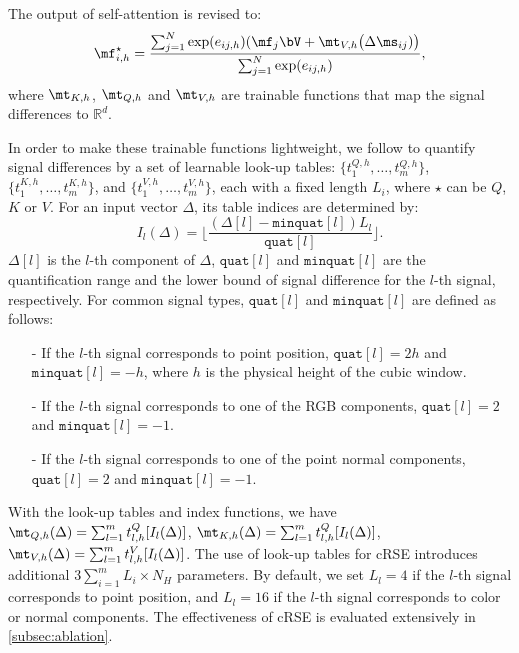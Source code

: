 \documentclass[10pt,twocolumn,letterpaper]{article}
\begin{document}
The output of self-attention is revised to:
\begin{equation}
\mf^\star_{i,h} = \dfrac{\sum_{j=1}^N \exp(e_{ij,h}) (\mf_j \bV +  \mt_{V,h}\bigl(\Delta \ms_{ij})\bigr)}{\sum_{j=1}^N \exp(e_{ij,h})},
\end{equation}
where $\mt_{K,h}$, $\mt_{Q,h}$ and $\mt_{V,h}$ are trainable functions that map the signal differences to $\mathbb{R}^d$.

In order to make these trainable functions lightweight, we follow \cite{shaw2018self, lai2022stratified} to quantify signal differences by a set of learnable look-up tables: $\{t^{Q,h}_1, \ldots, t^{Q,h}_m\}$, $\{t^{K,h}_1, \ldots, t^{K,h}_m\}$, and $\{t^{V,h}_1, \ldots, t^{V,h}_m\}$, each with a fixed length $L_i$, where $\star$ can be $Q$, $K$ or $V$. For an input vector $\Delta$, its table indices are determined by: \begin{equation} I_l(\Delta) = \bigl\lfloor \frac{( \Delta[l] - \texttt{minquat}[l] )L_l}{\texttt{quat}[l]} \bigr\rfloor. \end{equation} $\Delta[l]$ is the $l$-th component of $\Delta$, $\texttt{quat}[l]$ and $\texttt{minquat}[l]$ are the quantification range and the lower bound of signal difference for the $l$-th signal, respectively. For common signal types, $\texttt{quat}[l]$ and $\texttt{minquat}[l]$ are defined as follows:
\begin{enumerate}[leftmargin=*]\item[-]  If the $l$-th signal corresponds to point position, $\texttt{quat}[l] = 2 h$ and $\texttt{minquat}[l] = -h$, where $h$ is the physical height of the cubic window.
\item[-] If the $l$-th signal corresponds to one of the RGB components, $\texttt{quat}[l] = 2$ and $\texttt{minquat}[l] = -1$.
\item[-] If the $l$-th signal corresponds to one of the point normal components, $\texttt{quat}[l] = 2$ and $\texttt{minquat}[l] = -1$.
\end{enumerate}
With the look-up tables and index functions, we have $\mt_{Q,h} (\Delta) = \sum_{l=1}^m t^Q_{l,h}[I_l(\Delta)]$, $\mt_{K,h} (\Delta) = \sum_{l=1}^m t^Q_{l,h}[I_l(\Delta)]$, $\mt_{V,h} (\Delta) = \sum_{l=1}^m t^V_{l,h}[I_l(\Delta)]$. The use of look-up tables for cRSE introduces additional $3\sum_{i=1}^m L_i \times N_H $ parameters. By default, we set $L_l = 4$ if the $l$-th signal corresponds to point position, and $L_l = 16$ if the $l$-th signal corresponds to color or normal components. The effectiveness of cRSE is evaluated extensively in \cref{subsec:ablation}.
\end{document}
